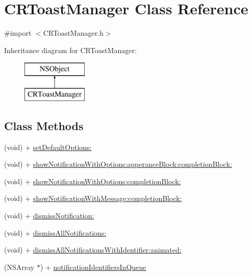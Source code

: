 \hypertarget{interface_c_r_toast_manager}{}\section{C\+R\+Toast\+Manager Class Reference}
\label{interface_c_r_toast_manager}


{\ttfamily \#import $<$C\+R\+Toast\+Manager.\+h$>$}

Inheritance diagram for C\+R\+Toast\+Manager\+:\begin{figure}[H]
\begin{center}
\leavevmode
\includegraphics[height=2.000000cm]{interface_c_r_toast_manager}
\end{center}
\end{figure}
\subsection*{Class Methods}
\begin{DoxyCompactItemize}
\item 
(void) + \hyperlink{interface_c_r_toast_manager_a4e9787d1b742548cc0142f8f49f6901a}{set\+Default\+Options\+:}
\item 
(void) + \hyperlink{interface_c_r_toast_manager_a8b396b8fdf401274b75ba7801c740437}{show\+Notification\+With\+Options\+:apperance\+Block\+:completion\+Block\+:}
\item 
(void) + \hyperlink{interface_c_r_toast_manager_af31ea2b0c5931a95de5dd66492c0a01f}{show\+Notification\+With\+Options\+:completion\+Block\+:}
\item 
(void) + \hyperlink{interface_c_r_toast_manager_ad62c45332d424fcb9e74d3b357ae2cb0}{show\+Notification\+With\+Message\+:completion\+Block\+:}
\item 
(void) + \hyperlink{interface_c_r_toast_manager_af6e7095ce5426c7f307e33c1a4afdad4}{dismiss\+Notification\+:}
\item 
(void) + \hyperlink{interface_c_r_toast_manager_ab38e43a4f61f422992bf86be606cef83}{dismiss\+All\+Notifications\+:}
\item 
(void) + \hyperlink{interface_c_r_toast_manager_a18de2c798ac3ac279d0994c84242242b}{dismiss\+All\+Notifications\+With\+Identifier\+:animated\+:}
\item 
(N\+S\+Array $\ast$) + \hyperlink{interface_c_r_toast_manager_ad1a635d69573f48e6e2499e59919ac28}{notification\+Identifiers\+In\+Queue}
\end{DoxyCompactItemize}


